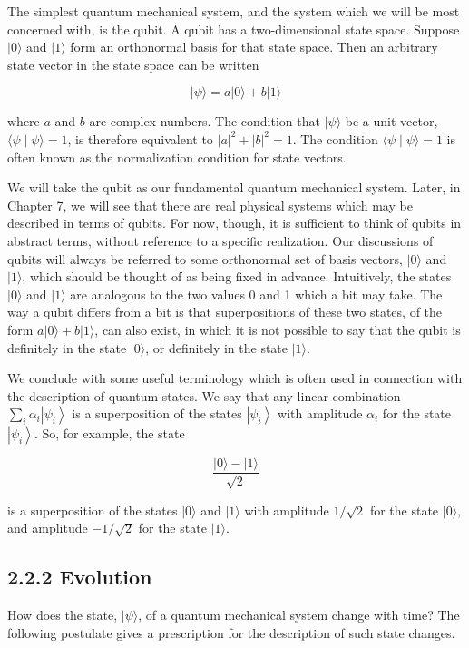 \documentclass[10pt]{article}
\begin{document}
The simplest quantum mechanical system, and the system which we will be most concerned with, is the qubit. A qubit has a two-dimensional state space. Suppose $|0\rangle$ and $|1\rangle$ form an orthonormal basis for that state space. Then an arbitrary state vector in the state space can be written


\begin{equation*}
|\psi\rangle=a|0\rangle+b|1\rangle \tag{2.82}
\end{equation*}


where $a$ and $b$ are complex numbers. The condition that $|\psi\rangle$ be a unit vector, $\langle\psi \mid \psi\rangle=1$, is therefore equivalent to $|a|^{2}+|b|^{2}=1$. The condition $\langle\psi \mid \psi\rangle=1$ is often known as the normalization condition for state vectors.

We will take the qubit as our fundamental quantum mechanical system. Later, in Chapter 7, we will see that there are real physical systems which may be described in terms of qubits. For now, though, it is sufficient to think of qubits in abstract terms, without reference to a specific realization. Our discussions of qubits will always be referred to some orthonormal set of basis vectors, $|0\rangle$ and $|1\rangle$, which should be thought of as being fixed in advance. Intuitively, the states $|0\rangle$ and $|1\rangle$ are analogous to the two values 0 and 1 which a bit may take. The way a qubit differs from a bit is that superpositions of these two states, of the form $a|0\rangle+b|1\rangle$, can also exist, in which it is not possible to say that the qubit is definitely in the state $|0\rangle$, or definitely in the state $|1\rangle$.

We conclude with some useful terminology which is often used in connection with the description of quantum states. We say that any linear combination $\sum_{i} \alpha_{i}\left|\psi_{i}\right\rangle$ is a superposition of the states $\left|\psi_{i}\right\rangle$ with amplitude $\alpha_{i}$ for the state $\left|\psi_{i}\right\rangle$. So, for example, the state


\begin{equation*}
\frac{|0\rangle-|1\rangle}{\sqrt{2}} \tag{2.83}
\end{equation*}


is a superposition of the states $|0\rangle$ and $|1\rangle$ with amplitude $1 / \sqrt{2}$ for the state $|0\rangle$, and amplitude $-1 / \sqrt{2}$ for the state $|1\rangle$.

\subsection*{2.2.2 Evolution}
How does the state, $|\psi\rangle$, of a quantum mechanical system change with time? The following postulate gives a prescription for the description of such state changes.
\end{document}
